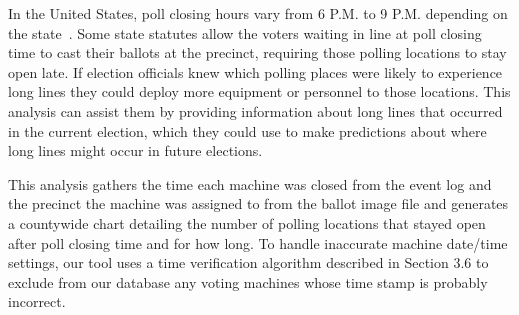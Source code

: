 In the United States, poll closing hours vary from 6 P.M. to 9 P.M. depending on the
state~\cite{Info2007}. Some state statutes allow the voters waiting in
line at poll closing time to cast their ballots at the precinct, requiring those
polling locations to stay open late. If election officials knew which polling
places were likely to 
experience long lines they could deploy more equipment or personnel to
those locations. This analysis can assist them by providing
information about long lines that occurred in the current election, which they
could use to make predictions about where
long lines might occur in future elections.

This analysis gathers the time each machine was closed from the event log and
the precinct the machine was assigned to from the ballot image file
and generates a countywide chart detailing the number of polling
locations that stayed open after poll closing time and for how long. To handle
inaccurate machine date/time settings, our tool uses a time verification
algorithm described in Section 3.6 to exclude from our database any voting
machines whose time stamp is probably incorrect. 

